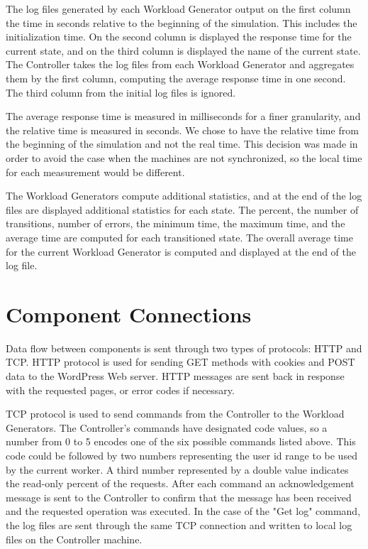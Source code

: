 The log files generated by each Workload Generator output on the first column the time in seconds relative to the beginning of the simulation. This includes the initialization time. On the second column is displayed the response time for the current state, and on the third column is displayed the name of the current state. The Controller takes the log files from each Workload Generator and aggregates them by the first column, computing the average response time in one second. The third column from the initial log files is ignored.

The average response time is measured in milliseconds for a finer granularity, and the relative time is measured in seconds. We chose to have the relative time from the beginning of the simulation and not the real time. This decision was made in order to avoid the case when the machines are not synchronized, so the local time for each measurement would be different.

The Workload Generators compute additional statistics, and at the end of the log files are displayed additional statistics for each state. The percent, the number of transitions, number of errors, the minimum time, the maximum time, and the average time are computed for each transitioned state. The overall average time for the current Workload Generator is computed and displayed at the end of the log file.

\section{Component Connections}
\label{sec:component-connections}

Data flow between components is sent through two types of protocols: HTTP and TCP. HTTP protocol is used for sending GET methods with cookies and POST data to the WordPress Web server. HTTP messages are sent back in response with the requested pages, or error codes if necessary. 

TCP protocol is used to send commands from the Controller to the Workload Generators. The Controller's commands have designated code values, so a number from 0 to 5 encodes one of the six possible commands listed above. This code could be followed by two numbers representing the user id range to be used by the current worker. A third number represented by a double value indicates the read-only percent of the requests. After each command an acknowledgement message is sent to the Controller to confirm that the message has been received and the requested operation was executed. In the case of the "Get log" command, the log files are sent through the same TCP connection and written to local log files on the Controller machine. 

